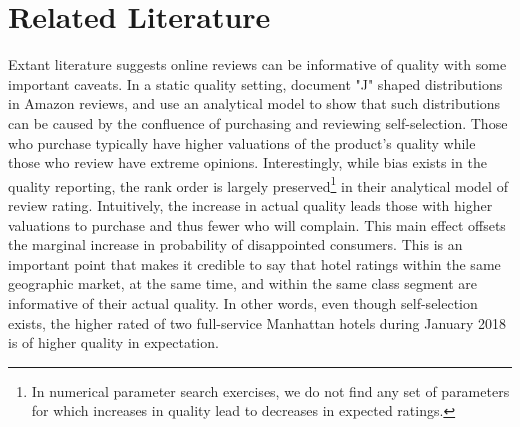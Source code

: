 \documentclass[mksc,blindrev]{informs3} %
\begin{document}
\section{Related Literature} \label{sec:litreview}

 

Extant literature suggests online reviews can be informative of quality with some important caveats. In a static quality setting, \citet{hu2006can} document "J" shaped distributions in Amazon reviews, and use an analytical model to show that such distributions can be caused by the confluence of purchasing and reviewing self-selection. Those who purchase typically have higher valuations of the product's quality while those who review have extreme opinions. Interestingly, while bias exists in the quality reporting, the rank order is largely preserved\footnote{In numerical parameter search exercises, we do not find any set of parameters for which increases in quality lead to decreases in expected ratings.} in their analytical model of review rating. Intuitively, the increase in actual quality leads those with higher valuations to purchase and thus fewer who will complain. This main effect offsets the marginal increase in probability of disappointed consumers. This is an important point that makes it credible to say that hotel ratings within the same geographic market, at the same time, and within the same class segment are informative of their actual quality. In other words, even though self-selection exists, the higher rated of two full-service Manhattan hotels during January 2018 is of higher quality in expectation.
\end{document}
